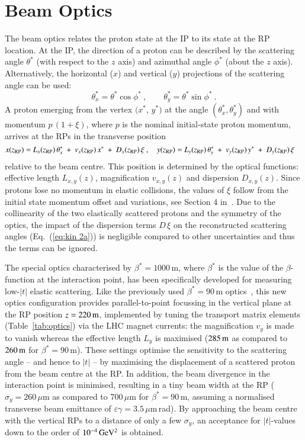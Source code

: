 \section{Beam Optics}
\label{sec:beam optics}
%
The beam optics relates the proton state at the IP to its state at the RP location. At the IP, the direction of a proton can be described by the scattering angle $\theta^*$ (with respect to the $z$ axis) and azimuthal angle $\phi^*$ (about the $z$ axis). Alternatively, the horizontal ($x$) and vertical ($y$) projections of the scattering angle can be used:
\begin{equation}
\label{eq:scatt angle}
\theta_x^* = \theta^* \cos\phi^*\ ,\qquad \theta_y^* = \theta^* \sin\phi^*\ .
\end{equation}
A proton emerging from the vertex $(x^*$, $y^*)$ at the angle $(\theta_x^*,\theta_y^*)$ and with momentum $p\,(1+\xi)$, where $p$ is the nominal initial-state proton momentum, arrives at the RPs in the transverse position
\begin{equation}
\label{eq:prot trans}
x(z_{\rm RP}) = L_x(z_{\rm RP})\, \theta_x^*\ +\ v_x(z_{\rm RP})\, x^*\ +\ D_x(z_{\rm RP})\, \xi\ ,\quad y(z_{\rm RP}) = L_y(z_{\rm RP})\, \theta_y^*\ +\ v_y(z_{\rm RP})\, y^*\ +\ D_y(z_{\rm RP})\, \xi \quad
\end{equation}
relative to the beam centre. This position is determined by the optical functions: effective length $L_{x,y}(z)$, magnification $v_{x,y}(z)$ and dispersion $D_{x,y}(z)$. Since protons lose no momentum in elastic collisions, the values of $\xi$ follow from the initial state momentum offset and variations, see Section 4 in~\cite{8tev-90m}. Due to the collinearity of the two elastically scattered protons and the symmetry of the optics, the impact of the dispersion terms $D\,\xi$ on the reconstructed scattering angles (Eq.~(\ref{eq:kin 2a})) is negligible compared to other uncertainties and thus the terms can be ignored.

The special optics characterised by $\beta^{*} = 1000\,$m, where $\beta^{*}$ is the value of the $\beta$-function at the interaction point,
has been specifically developed for measuring low-$|t|$ elastic scattering.
Like the previously used $\beta^{*} = 90\,$m optics~\cite{epl96,epl101-el,epl101-tot,prl111}, this new optics configuration
provides parallel-to-point focussing in the vertical plane at the RP position 
$z = 220\,{\rm m}$, implemented by tuning the transport matrix elements 
(Table~\ref{tab:optics}) via the
LHC magnet currents: the magnification $v_{y}$ is made to vanish whereas the 
effective length $L_{y}$ is maximised ($285\,{\rm m}$ as compared to $260\,{\rm m}$ for $\beta^{*} = 90\,$m). These settings optimise the sensitivity to the scattering angle -- and hence to $|t|$ -- by maximising the displacement of a scattered proton from the beam centre at the RP. In addition, the beam divergence in the 
interaction point is minimised, resulting in a tiny beam width 
at the RP ($\sigma_{y} = 260\,\mu$m as compared to 700\,$\mu$m for 
$\beta^{*} = 90\,$m, assuming a normalised transverse beam emittance of $\varepsilon \gamma = 3.5\,\mu$m\,rad). By approaching the beam centre with the vertical RPs to a distance of only a few $\sigma_{y}$, an acceptance for $|t|$-values down to the order of $10^{-4}\,\rm GeV^{2}$ is obtained.

